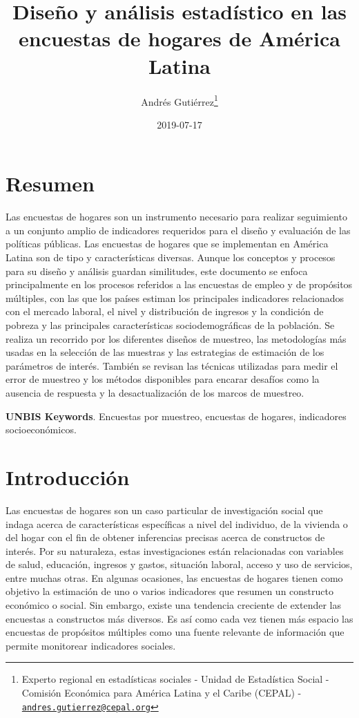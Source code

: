 \documentclass[12pt,spanish,]{book}
\title{Diseño y análisis estadístico en las encuestas de hogares de América Latina}
\author{Andrés Gutiérrez\footnote{Experto regional en estadísticas sociales - Unidad de Estadística Social - Comisión Económica para América Latina y el Caribe (CEPAL) - \href{mailto:andres.gutierrez@cepal.org}{\nolinkurl{andres.gutierrez@cepal.org}}}}
\date{2019-07-17}
\begin{document}
\maketitle

{
\hypersetup{linkcolor=black}
\setcounter{tocdepth}{1}
\tableofcontents
}
\listoftables
\listoffigures
\hypertarget{resumen}{%
\chapter*{Resumen}\label{resumen}}

Las encuestas de hogares son un instrumento necesario para realizar seguimiento a un conjunto amplio de indicadores requeridos para el diseño y evaluación de las políticas públicas. Las encuestas de hogares que se implementan en América Latina son de tipo y características diversas. Aunque los conceptos y procesos para su diseño y análisis guardan similitudes, este documento se enfoca principalmente en los procesos referidos a las encuestas de empleo y de propósitos múltiples, con las que los países estiman los principales indicadores relacionados con el mercado laboral, el nivel y distribución de ingresos y la condición de pobreza y las principales características sociodemográficas de la población. Se realiza un recorrido por los diferentes diseños de muestreo, las metodologías más usadas en la selección de las muestras y las estrategias de estimación de los parámetros de interés. También se revisan las técnicas utilizadas para medir el error de muestreo y los métodos disponibles para encarar desafíos como la ausencia de respuesta y la desactualización de los marcos de muestreo.

\textbf{UNBIS Keywords}. Encuestas por muestreo, encuestas de hogares, indicadores socioeconómicos.

\hypertarget{introduccion}{%
\chapter{Introducción}\label{introduccion}}

Las encuestas de hogares son un caso particular de investigación social que indaga acerca de características específicas a nivel del individuo, de la vivienda o del hogar con el fin de obtener inferencias precisas acerca de constructos de interés. Por su naturaleza, estas investigaciones están relacionadas con variables de salud, educación, ingresos y gastos, situación laboral, acceso y uso de servicios, entre muchas otras. En algunas ocasiones, las encuestas de hogares tienen como objetivo la estimación de uno o varios indicadores que resumen un constructo económico o social. Sin embargo, existe una tendencia creciente de extender las encuestas a constructos más diversos. Es así como cada vez tienen más espacio las encuestas de propósitos múltiples como una fuente relevante de información que permite monitorear indicadores sociales.
\end{document}
